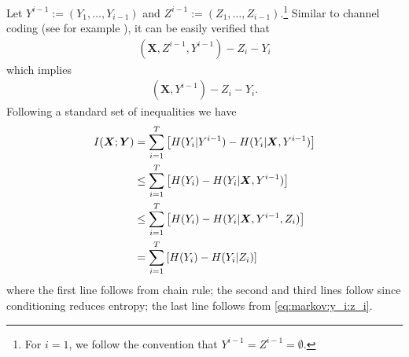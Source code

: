 \documentclass[onecolumn,letterpaper]{IEEEtran}
\newcommand{\cM}{{\boldsymbol{M}}}
\newcommand{\cx}{{X}}
\newcommand{\cy}{{Y}}
\newcommand{\cxh}{{\hat{X}}}
\newcommand{\etp}{{H}}
\newcommand{\mi}{{I}}
\newcommand{\cA}{{Z}}
\begin{document}
Let $\cy^{i-1}:=(\cy_1,\dots,\cy_{i-1})$ and $\cA^{i-1}:=(\cA_1,\dots,\cA_{i-1})$.\footnote{For $i=1$, we follow the convention that $\cy^{i-1}=\cA^{i-1}=\emptyset$.} Similar to channel coding (see for example \cite[Sec. 7.3]{yeung08}), it can be easily verified that \begin{align*}
(\boldsymbol{\cx},\cA^{i-1}, \cy^{i-1}) - \cA_i - \cy_i
\end{align*}
which implies
\begin{align}
\label{eq:markov:y_i:z_i}
(\boldsymbol{\cx}, \cy^{i-1}) - \cA_i - \cy_i.
\end{align}
Following a standard set of inequalities we have
\begin{align}
I(\boldsymbol{\cx};\boldsymbol{\cy})&=\sum\limits_{i=1}^{T} \left[\etp(\cy_i | \cy^{i-1}) - \etp(\cy_i |\boldsymbol{\cx},\cy^{i-1})\right] \notag\\
                                  &\leq \sum\limits_{i=1}^{T} \left[\etp(\cy_i  ) - \etp(\cy_i | \boldsymbol{\cx},\cy^{i-1})\right]  \notag\\
                                  &\leq\sum\limits_{i=1}^{T} \left[\etp(\cy_i  ) - \etp(\cy_i | \boldsymbol{\cx},\cy^{i-1},\cA_i)\right] \notag\\
                                  &= \sum\limits_{i=1}^{T} \left[\etp(\cy_i  ) - \etp(\cy_i | \cA_i)\right] \label{eq:cv:mi_3}
\end{align}
where the first line follows from chain rule; the second and third lines follow since conditioning reduces entropy;
the last line follows from \eqref{eq:markov:y_i:z_i}.

\end{document}

